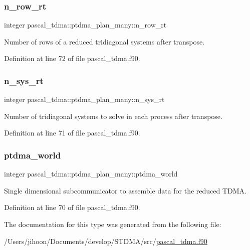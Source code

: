 \subsubsection{\texorpdfstring{n\_row\_rt}{n\_row\_rt}}
{\footnotesize\ttfamily integer pascal\+\_\+tdma\+::ptdma\+\_\+plan\+\_\+many\+::n\+\_\+row\+\_\+rt}



Number of rows of a reduced tridiagonal systems after transpose. 



Definition at line 72 of file pascal\+\_\+tdma.\+f90.

\mbox{\label{structpascal__tdma_1_1ptdma__plan__many_a22b42947ab742f83aad3bbeb3a42a0f6}} 
\subsubsection{\texorpdfstring{n\_sys\_rt}{n\_sys\_rt}}
{\footnotesize\ttfamily integer pascal\+\_\+tdma\+::ptdma\+\_\+plan\+\_\+many\+::n\+\_\+sys\+\_\+rt}



Number of tridiagonal systems to solve in each process after transpose. 



Definition at line 71 of file pascal\+\_\+tdma.\+f90.

\mbox{\label{structpascal__tdma_1_1ptdma__plan__many_acb7e645e37c791564905c6e2808db0c6}} 
\subsubsection{\texorpdfstring{ptdma\_world}{ptdma\_world}}
{\footnotesize\ttfamily integer pascal\+\_\+tdma\+::ptdma\+\_\+plan\+\_\+many\+::ptdma\+\_\+world}



Single dimensional subcommunicator to assemble data for the reduced T\+D\+MA. 



Definition at line 70 of file pascal\+\_\+tdma.\+f90.



The documentation for this type was generated from the following file\+:\begin{DoxyCompactItemize}
\item 
/\+Users/jihoon/\+Documents/develop/\+S\+T\+D\+M\+A/src/\mbox{\hyperlink{pascal__tdma_8f90}{pascal\+\_\+tdma.\+f90}}\end{DoxyCompactItemize}

